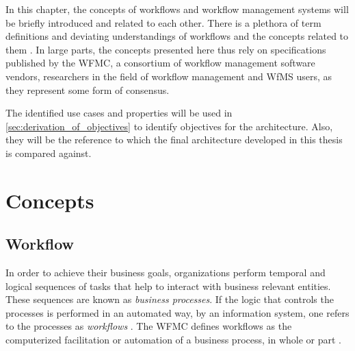 
In this chapter, the concepts of workflows and workflow management systems will be briefly introduced and related to each other. 
There is a plethora of term definitions and deviating understandings of workflows and the concepts related to them \cite{Casati1999Specification}. 
In large parts, the concepts presented here thus rely on specifications published by the \ac{WFMC}, a consortium of workflow management software vendors, researchers in the field of workflow management and \ac{WfMS} users, as they represent some form of consensus.

The identified use cases and properties will be used in \ref{sec:derivation_of_objectives} to identify objectives for the architecture. Also, they will be the reference to which the final architecture developed in this thesis is compared against.



\section{Concepts} %
\label{sec:concepts}

  \subsection{Workflow} %
  \label{sub:workflow}
    In order to achieve their business goals, organizations perform temporal and logical sequences of tasks that help to interact with business relevant entities. These sequences are known as \emph{business processes}. If the logic that controls the processes is performed in an automated way, \eg by an information system, one refers to the processes as \emph{workflows} \cite{Becker1999Identifying,Hollingsworth1995Wfmc}. The \ac{WFMC} defines workflows as the computerized facilitation or automation of a business process, in whole or part \cite{Hollingsworth1995Wfmc}.

